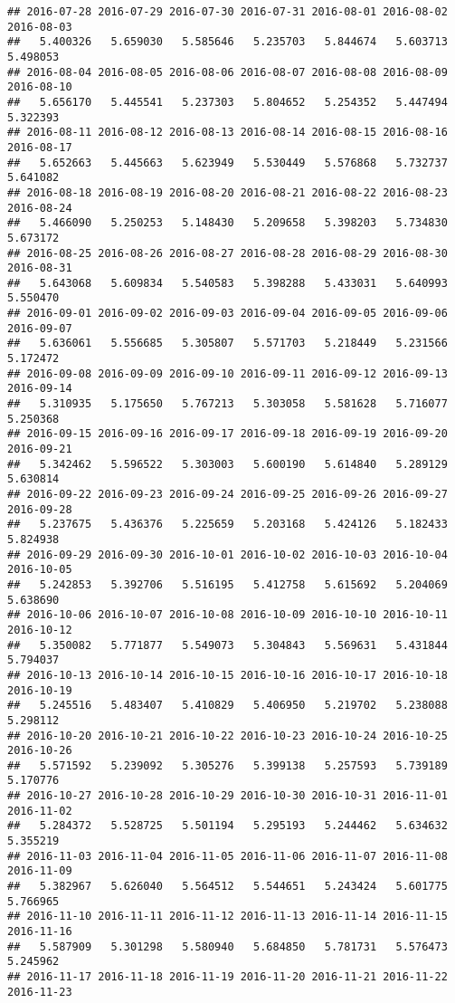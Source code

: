\documentclass[
]{article}
\begin{document}
\begin{verbatim}
## 2016-07-28 2016-07-29 2016-07-30 2016-07-31 2016-08-01 2016-08-02 2016-08-03 
##   5.400326   5.659030   5.585646   5.235703   5.844674   5.603713   5.498053 
## 2016-08-04 2016-08-05 2016-08-06 2016-08-07 2016-08-08 2016-08-09 2016-08-10 
##   5.656170   5.445541   5.237303   5.804652   5.254352   5.447494   5.322393 
## 2016-08-11 2016-08-12 2016-08-13 2016-08-14 2016-08-15 2016-08-16 2016-08-17 
##   5.652663   5.445663   5.623949   5.530449   5.576868   5.732737   5.641082 
## 2016-08-18 2016-08-19 2016-08-20 2016-08-21 2016-08-22 2016-08-23 2016-08-24 
##   5.466090   5.250253   5.148430   5.209658   5.398203   5.734830   5.673172 
## 2016-08-25 2016-08-26 2016-08-27 2016-08-28 2016-08-29 2016-08-30 2016-08-31 
##   5.643068   5.609834   5.540583   5.398288   5.433031   5.640993   5.550470 
## 2016-09-01 2016-09-02 2016-09-03 2016-09-04 2016-09-05 2016-09-06 2016-09-07 
##   5.636061   5.556685   5.305807   5.571703   5.218449   5.231566   5.172472 
## 2016-09-08 2016-09-09 2016-09-10 2016-09-11 2016-09-12 2016-09-13 2016-09-14 
##   5.310935   5.175650   5.767213   5.303058   5.581628   5.716077   5.250368 
## 2016-09-15 2016-09-16 2016-09-17 2016-09-18 2016-09-19 2016-09-20 2016-09-21 
##   5.342462   5.596522   5.303003   5.600190   5.614840   5.289129   5.630814 
## 2016-09-22 2016-09-23 2016-09-24 2016-09-25 2016-09-26 2016-09-27 2016-09-28 
##   5.237675   5.436376   5.225659   5.203168   5.424126   5.182433   5.824938 
## 2016-09-29 2016-09-30 2016-10-01 2016-10-02 2016-10-03 2016-10-04 2016-10-05 
##   5.242853   5.392706   5.516195   5.412758   5.615692   5.204069   5.638690 
## 2016-10-06 2016-10-07 2016-10-08 2016-10-09 2016-10-10 2016-10-11 2016-10-12 
##   5.350082   5.771877   5.549073   5.304843   5.569631   5.431844   5.794037 
## 2016-10-13 2016-10-14 2016-10-15 2016-10-16 2016-10-17 2016-10-18 2016-10-19 
##   5.245516   5.483407   5.410829   5.406950   5.219702   5.238088   5.298112 
## 2016-10-20 2016-10-21 2016-10-22 2016-10-23 2016-10-24 2016-10-25 2016-10-26 
##   5.571592   5.239092   5.305276   5.399138   5.257593   5.739189   5.170776 
## 2016-10-27 2016-10-28 2016-10-29 2016-10-30 2016-10-31 2016-11-01 2016-11-02 
##   5.284372   5.528725   5.501194   5.295193   5.244462   5.634632   5.355219 
## 2016-11-03 2016-11-04 2016-11-05 2016-11-06 2016-11-07 2016-11-08 2016-11-09 
##   5.382967   5.626040   5.564512   5.544651   5.243424   5.601775   5.766965 
## 2016-11-10 2016-11-11 2016-11-12 2016-11-13 2016-11-14 2016-11-15 2016-11-16 
##   5.587909   5.301298   5.580940   5.684850   5.781731   5.576473   5.245962 
## 2016-11-17 2016-11-18 2016-11-19 2016-11-20 2016-11-21 2016-11-22 2016-11-23 

\end{verbatim}
\end{document}

